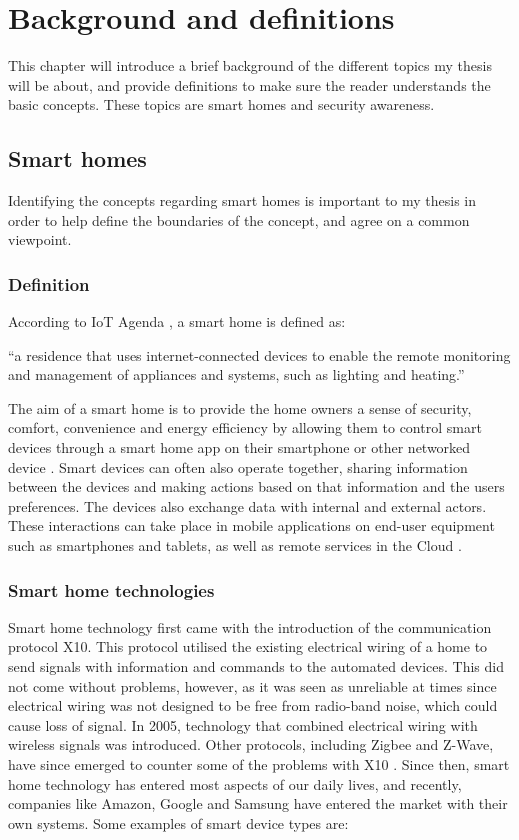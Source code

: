 \chapter{Background and definitions}
\label{chap:background}
This chapter will introduce a brief background of the different topics my thesis will be about, and provide definitions to make sure the reader understands the basic concepts. These topics are smart homes and security awareness. 

\section{Smart homes}
Identifying the concepts regarding smart homes is important to my thesis in order to help define the boundaries of the concept, and agree on a common viewpoint. 

\subsection{Definition}
According to IoT Agenda \cite{Rouse}, a smart home is defined as:
\begin{displayquote} 
``a residence that uses internet-connected devices to enable the remote monitoring and management of appliances and systems, such as lighting and heating.''
\end{displayquote}

\noindent The aim of a smart home is to provide the home owners a sense of security, comfort, convenience and energy efficiency by allowing them to control smart devices through a smart home app on their smartphone or other networked device \cite{Rouse}. Smart devices can often also operate together, sharing information between the devices and making actions based on that information and the users preferences. The devices also exchange data with internal and
external actors. These interactions can take place in mobile applications on end-user equipment such as smartphones and tablets, as well as remote services in the Cloud \cite{ENISA2015SmartHome}.

\subsection{Smart home technologies}
Smart home technology first came with the introduction of the communication protocol X10. This protocol utilised the existing electrical wiring of a home to send signals with information and commands to the automated devices. This did not come without problems, however, as it was seen as unreliable at times since electrical wiring was not designed to be free from radio-band noise, which could cause loss of signal. In 2005, technology that combined electrical wiring with wireless signals was introduced. Other protocols, including Zigbee and Z-Wave, have since emerged to counter some of the problems with X10 \cite{Rouse}. Since then, smart home technology has entered most aspects of our daily lives, and recently, companies like Amazon, Google and Samsung have entered the market with their own systems. Some examples of smart device types are:


